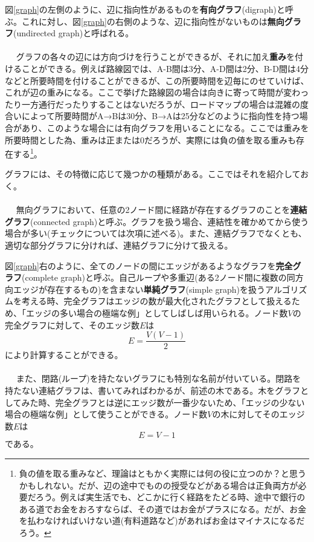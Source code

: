 図\ref{graph}の左側のように、辺に指向性があるものを\textbf{有向グラフ}(digraph)と呼ぶ。これに対し、図\ref{graph}の右側のような、辺に指向性がないものは\textbf{無向グラフ}(undirected graph)と呼ばれる。
\\ \\　
グラフの各々の辺には方向づけを行うことができるが、それに加え\textbf{重み}を付けることができる。例えば路線図では、A-B間は3分、A-D間は2分、B-D間は4分などと所要時間を付けることができるが、この所要時間を辺毎にのせていけば、これが辺の重みになる。ここで挙げた路線図の場合は向きに寄って時間が変わったり一方通行だったりすることはないだろうが、ロードマップの場合は混雑の度合いによって所要時間がA→Bは30分、B→Aは25分などのように指向性を持つ場合があり、このような場合には有向グラフを用いることになる。ここでは重みを所要時間とした為、重みは正または0だろうが、実際には負の値を取る重みも存在する\footnote{負の値を取る重みなど、理論はともかく実際には何の役に立つのか？と思うかもしれない。だが、辺の途中でものの授受などがある場合は正負両方が必要だろう。例えば実生活でも、どこかに行く経路をたどる時、途中で銀行のある道でお金をおろすならば、その道ではお金がプラスになる。だが、お金を払わなければいけない道(有料道路など)があればお金はマイナスになるだろう。}。

グラフには、その特徴に応じて幾つかの種類がある。ここではそれを紹介しておく。
\\ \\　
無向グラフにおいて、任意の2ノード間に経路が存在するグラフのことを\textbf{連結グラフ}(connected graph)と呼ぶ。グラフを扱う場合、連結性を確かめてから使う場合が多い(チェックについては次項に述べる)。また、連結グラフでなくとも、適切な部分グラフに分ければ、連結グラフに分けて扱える。

図\ref{graph}右のように、全てのノードの間にエッジがあるようなグラフを\textbf{完全グラフ}(complete graph)と呼ぶ。自己ループや多重辺(ある2ノード間に複数の同方向エッジが存在するもの)を含まない\textbf{単純グラフ}(simple graph)を扱うアルゴリズムを考える時、完全グラフはエッジの数が最大化されたグラフとして扱えるため、「エッジの多い場合の極端な例」としてしばしば用いられる。ノード数$V$の完全グラフに対して、そのエッジ数$E$は
\begin{equation}
E=\frac{V(V-1)}{2}
\end{equation}
により計算することができる。
\\ \\　
また、閉路(ループ)を持たないグラフにも特別な名前が付いている。閉路を持たない連結グラフは、書いてみればわかるが、前述の木である。木をグラフとしてみた時、完全グラフとは逆にエッジ数が一番少ないため、「エッジの少ない場合の極端な例」として使うことができる。ノード数$V$の木に対してそのエッジ数$E$は
\begin{equation}
E=V-1
\end{equation}
である。

